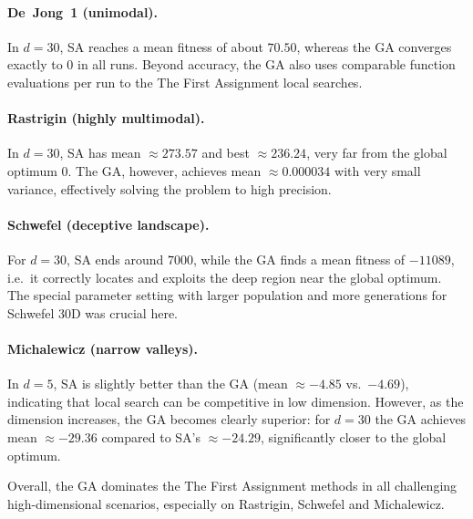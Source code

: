 \documentclass[a4paper,11pt]{article}
\begin{document}
\vspace{1em}

\paragraph{De~Jong~1 (unimodal).}
In $d=30$, SA reaches a mean fitness of about $70.50$, whereas the GA
converges exactly to $0$ in all runs. Beyond accuracy, the GA also uses
comparable function evaluations per run to the The First Assignment local searches.

\vspace{0.8em}

\paragraph{Rastrigin (highly multimodal).}
In $d=30$, SA has mean $\approx 273.57$ and best $\approx 236.24$, very far
from the global optimum $0$. The GA, however, achieves mean $\approx 0.000034$
with very small variance, effectively solving the problem to high precision.

\vspace{0.8em}

\paragraph{Schwefel (deceptive landscape).}
For $d=30$, SA ends around $7000$, while the GA finds a mean fitness of
$-11089$, i.e.\ it correctly locates and exploits the deep region near the
global optimum. The special parameter setting with larger population and more
generations for Schwefel 30D was crucial here.

\vspace{0.8em}

\paragraph{Michalewicz (narrow valleys).}
In $d=5$, SA is slightly better than the GA (mean $\approx -4.85$ vs.\ $-4.69$),
indicating that local search can be competitive in low dimension. However, as
the dimension increases, the GA becomes clearly superior:
for $d=30$ the GA achieves mean $\approx -29.36$ compared to SA's
$\approx -24.29$, significantly closer to the global optimum.

\vspace{1.5em}

\noindent Overall, the GA dominates the The First Assignment methods in all challenging high-dimensional
scenarios, especially on Rastrigin, Schwefel and Michalewicz.
\end{document}
